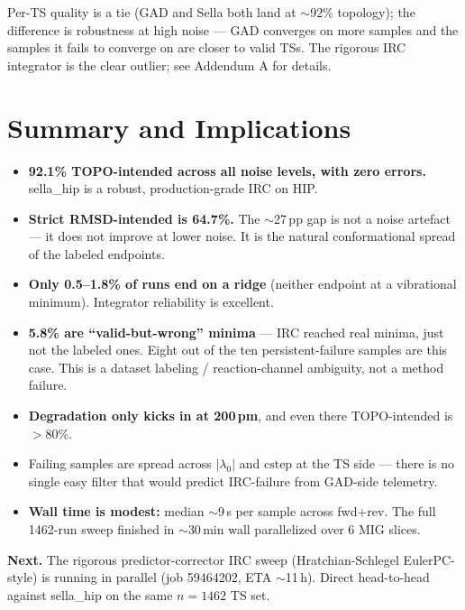 \documentclass[11pt]{article}
\begin{document}
Per-TS quality is a tie (GAD and Sella both land at $\sim$92\%
topology); the difference is robustness at high noise --- GAD converges
on more samples and the samples it fails to converge on are closer
to valid TSs. The rigorous IRC integrator is the clear outlier; see
Addendum A for details.

\section*{Summary and Implications}

\begin{itemize}[leftmargin=1.5em]
\item \textbf{92.1\% TOPO-intended across all noise levels, with zero errors.}
      sella\_hip is a robust, production-grade IRC on HIP.
\item \textbf{Strict RMSD-intended is 64.7\%.} The $\sim$27\,pp gap is not a
      noise artefact --- it does not improve at lower noise. It is the natural
      conformational spread of the labeled endpoints.
\item \textbf{Only 0.5--1.8\% of runs end on a ridge} (neither endpoint at a
      vibrational minimum). Integrator reliability is excellent.
\item \textbf{5.8\% are ``valid-but-wrong'' minima} --- IRC reached real
      minima, just not the labeled ones. Eight out of the ten persistent-failure
      samples are this case. This is a dataset labeling / reaction-channel
      ambiguity, not a method failure.
\item \textbf{Degradation only kicks in at 200\,pm}, and even there
      TOPO-intended is $>$80\%.
\item Failing samples are spread across $|\lambda_0|$ and $\mathrm{cstep}$
      at the TS side --- there is no single easy filter that would predict
      IRC-failure from GAD-side telemetry.
\item \textbf{Wall time is modest:} median $\sim$9\,s per sample across
      fwd$+$rev. The full 1462-run sweep finished in $\sim$30\,min wall
      parallelized over 6 MIG slices.
\end{itemize}

\textbf{Next.} The rigorous predictor-corrector IRC sweep (Hratchian-Schlegel
EulerPC-style) is running in parallel (job 59464202, ETA $\sim$11\,h).
Direct head-to-head against sella\_hip on the same $n=1462$ TS set.
\end{document}
